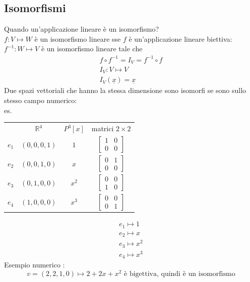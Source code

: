 \documentclass[italian]{article}
\newcommand{\ins}[1]{\text{$\mathbb{#1}$}}
\begin{document}
\subsection{Isomorfismi}
Quando un'applicazione lineare è un isomorfismo?\\
$f: V \longmapsto W$ è un isomorfismo lineare sse $f$ è un'applicazione lineare biettiva:\\[2mm]
$f^{-1}: W \longmapsto V$  è un isomorfismo lineare tale che
\begin{gather*}
	f \circ f^{-1} = I_V = f^{-1} \circ f \\
	I_V: V \longmapsto V \\
	I_V(\underline{x}) = \underline{x} 
\end{gather*}
\noindent
Due spazi vettoriali che hanno la stessa dimensione sono isomorfi se sono sullo stesso campo numerico:\\
es.
\begin{table}[h]
	\begin{tabular}{cccc}
		   & $\ins{R}^4$       	& $P^3[x]$ 		& matrici $2\times 2$ \\[5mm]
		   
		$e_1$  & $(0,0,0,1)$	& $1$   		& $\begin{bmatrix} 1 & 0 \\ 0 & 0 \end{bmatrix}$      
		  \\[5mm]
		$e_2$  & $(0,0,1,0)$    & $x$   		& $\begin{bmatrix} 0 & 1 \\ 0 & 0 \end{bmatrix}$           \\[5mm]
		$e_3$  & $(0,1,0,0)$    & $x^2$   		& $\begin{bmatrix} 0 & 0 \\ 1 & 0 \end{bmatrix}$           \\[5mm]
		$e_4$  & $(1,0,0,0)$    & $x^3$    		& $\begin{bmatrix} 0 & 0 \\ 0 & 1 \end{bmatrix}$          
	\end{tabular}
\end{table}
\begin{gather*}
	e_1 \longmapsto 1 \\
	e_2 \longmapsto x \\
	e_3 \longmapsto x^2 \\
	e_4 \longmapsto x^3
\end{gather*}
Esempio numerico : 
\[
	v=(2,2,1,0) \longmapsto 2 + 2x + x^2 \text{ è bigettiva, quindi è un isomorfismo}
\]
\end{document}
